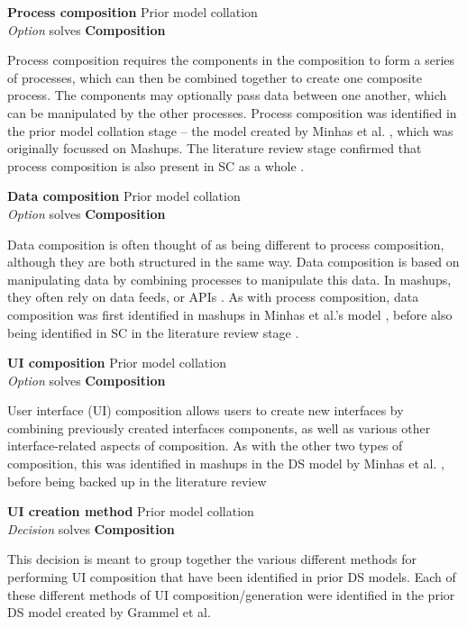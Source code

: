 \textbf{Process composition} \hfill Prior model collation \cite{Minhas2012,Daniel2007} \\ \emph{Option} \hfill solves \textbf{Composition}

Process composition requires the components in the composition to form a series of processes, which can then be combined together to create one composite process. The components may optionally pass data between one another, which can be manipulated by the other processes. Process composition was identified in the prior model collation stage -- the model created by Minhas et al. \cite{Minhas2012}, which was originally focussed on Mashups. The literature review stage confirmed that process composition is also present in SC as a whole \cite{Daniel2007}.

\textbf{Data composition} \hfill Prior model collation \cite{Minhas2012,Daniel2007} \\ \emph{Option} \hfill solves \textbf{Composition}

Data composition is often thought of as being different to process composition, although they are both structured in the same way. Data composition is based on manipulating data by combining processes to manipulate this data. In mashups, they often rely on data feeds, or APIs \cite{Minhas2012}. As with process composition, data composition was first identified in mashups in Minhas et al.'s model \cite{Minhas2012}, before also being identified in SC in the literature review stage \cite{Daniel2007}.

\textbf{UI composition} \hfill Prior model collation \cite{Minhas2012,Daniel2007} \\ \emph{Option} \hfill solves \textbf{Composition}

User interface (UI) composition allows users to create new interfaces by combining previously created interfaces components, as well as various other interface-related aspects of composition. As with the other two types of composition, this was identified in mashups in the DS model by Minhas et al. \cite{Minhas2012}, before being backed up in the literature review \cite{Daniel2007}

\textbf{UI creation method} \hfill Prior model collation \\ \emph{Decision} \hfill solves \textbf{Composition}

This decision is meant to group together the various different methods for performing UI composition that have been identified in prior DS models. Each of these different methods of UI composition/generation were identified in the prior DS model created by Grammel et al. \cite{Grammel2010}

